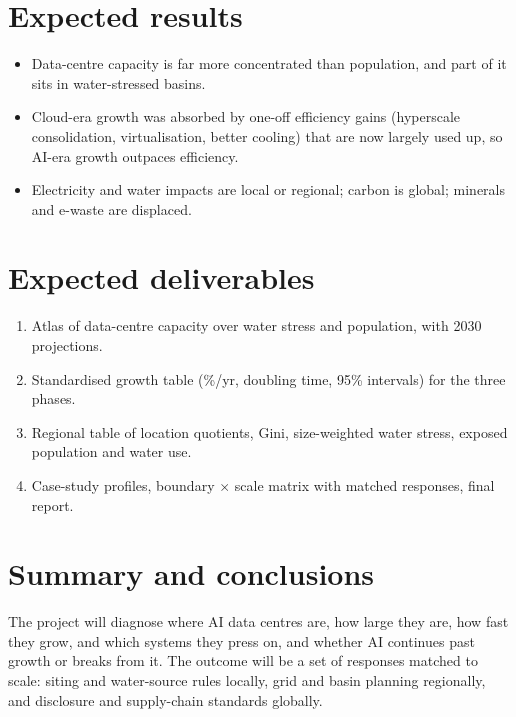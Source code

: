 \documentclass[10pt,a4paper]{article}
\begin{document}
\section{Expected results}
\begin{itemize}
  \item Data-centre capacity is far more concentrated than population, and part of it sits in water-stressed basins.
  \item Cloud-era growth was absorbed by one-off efficiency gains (hyperscale consolidation, virtualisation, better cooling) that are now largely used up, so AI-era growth outpaces efficiency.
  \item Electricity and water impacts are local or regional; carbon is global; minerals and e-waste are displaced.
\end{itemize}

\section{Expected deliverables}
\begin{enumerate}[label=\textbf{D\arabic*}]
  \item Atlas of data-centre capacity over water stress and population, with 2030 projections.
  \item Standardised growth table (\%/yr, doubling time, 95\% intervals) for the three phases.
  \item Regional table of location quotients, Gini, size-weighted water stress, exposed population and water use.
  \item Case-study profiles, boundary $\times$ scale matrix with matched responses, final report.
\end{enumerate}

\section{Summary and conclusions}
The project will diagnose where AI data centres are, how large they are, how fast they grow, and which systems they press on, and whether AI continues past growth or breaks from it. The outcome will be a set of responses matched to scale: siting and water-source rules locally, grid and basin planning regionally, and disclosure and supply-chain standards globally.
\end{document}
